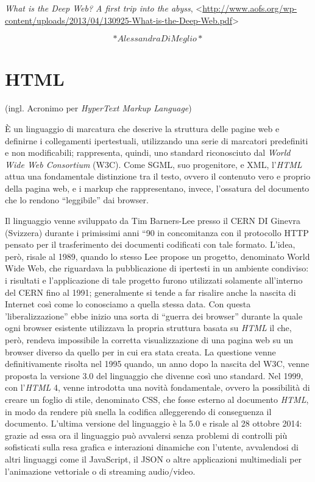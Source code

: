 \documentclass[
  b5paper,
  twoside,
  11pt,
  chapterprefix=false,
  bibliography=totocnumbered,
  listof=flat]{scrbook}
\begin{document}
\emph{What is the Deep Web? A first trip into the abyss},
\textless{}{\url{http://www.aofs.org/wp-content/uploads/2013/04/130925-What-is-the-Deep-Web.pdf}\textgreater{}}

\[*Alessandra Di Meglio*\]

\hypertarget{html}{%
\chapter{HTML}\label{html}}

(ingl. Acronimo per \emph{HyperText Markup Language})

È un linguaggio di marcatura che descrive la struttura delle pagine web
e definirne i collegamenti ipertestuali, utilizzando una serie di
marcatori predefiniti e non modificabili; rappresenta, quindi, uno
standard riconosciuto dal \emph{World Wide Web Consortium} (W3C). Come SGML,
suo progenitore, e XML, l'\emph{HTML} attua una fondamentale distinzione tra
il testo, ovvero il contenuto vero e proprio della pagina web, e i
markup che rappresentano, invece, l'ossatura del documento che lo
rendono \enquote{leggibile} dai browser.

Il linguaggio venne sviluppato da Tim Barners-Lee presso il CERN DI
Ginevra (Svizzera) durante i primissimi anni \enquote{90 in concomitanza con il
protocollo HTTP pensato per il trasferimento dei documenti codificati
con tale formato. L'idea, però, risale al 1989, quando lo stesso Lee
propose un progetto, denominato World Wide Web, che riguardava la
pubblicazione di ipertesti in un ambiente condiviso: i risultati e
l'applicazione di tale progetto furono utilizzati solamente all'interno
del CERN fino al 1991; generalmente si tende a far risalire anche la
nascita di Internet così come lo conosciamo a quella stessa data. Con
questa 'liberalizzazione} ebbe inizio una sorta di \enquote{guerra dei browser}
durante la quale ogni browser esistente utilizzava la propria struttura
basata su \emph{HTML} il che, però, rendeva impossibile la corretta
visualizzazione di una pagina web su un browser diverso da quello per in
cui era stata creata. La questione venne definitivamente risolta nel
1995 quando, un anno dopo la nascita del W3C, venne proposta la versione
3.0 del linguaggio che divenne così uno standard. Nel 1999, con l'\emph{HTML}
4, venne introdotta una novità fondamentale, ovvero la possibilità di
creare un foglio di stile, denominato CSS, che fosse esterno al
documento \emph{HTML}, in modo da rendere più snella la codifica alleggerendo
di conseguenza il documento. L'ultima versione del linguaggio è la 5.0 e
risale al 28 ottobre 2014: grazie ad essa ora il linguaggio può
avvalersi senza problemi di controlli più sofisticati sulla resa grafica
e interazioni dinamiche con l'utente, avvalendosi di altri linguaggi
come il JavaScript, il JSON o altre applicazioni multimediali per
l'animazione vettoriale o di streaming audio/video.
\end{document}
